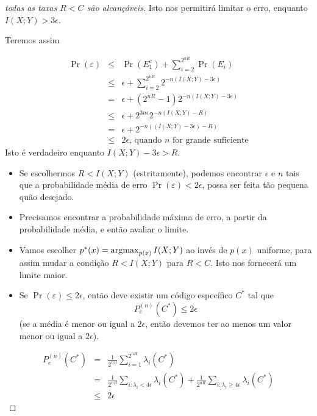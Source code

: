 \begin{frame}[allowframebreaks]
\begin{proof}[todas as taxas $R < C$ são alcançáveis]
  Isto nos permitirá limitar o erro, enquanto $I(X;Y) > 3\epsilon$.

  \proofbreak

  Teremos assim

  \vspace{-0.75cm}
  \begin{eqnarray}
  \Pr(\varepsilon) &\leq& \Pr(E_1^c) + \sum_{i=2}^{2^{nR}} \Pr(E_i) \nonumber \\
	&\leq& \epsilon + \sum_{i=2}^{2^{nR}} 2^{-n(I(X;Y)-3\epsilon)} \nonumber \\
	&=& \epsilon + (2^{nR} - 1) 2^{-n(I(X;Y)-3\epsilon)} \nonumber \\
	&\leq& \epsilon + 2^{3n\epsilon} 2^{-n(I(X;Y)-R)} \nonumber \\
	&=& \epsilon + 2^{-n((I(X;Y)-3\epsilon)-R)} \\
	&\leq& 2 \epsilon \text{, quando $n$ for grande suficiente}
  \end{eqnarray}
  \vspace{-0.3cm}
  Isto é verdadeiro enquanto $I(X;Y) -3\epsilon > R$.

  \proofbreak

  \begin{itemize}
  \item Se escolhermos $R < I(X;Y)$ (estritamente), podemos encontrar $\epsilon$ e $n$ tais que
	a probabilidade média de erro $\Pr(\varepsilon) < 2\epsilon$, possa ser feita tão pequena
	quão desejado.
  \item Precisamos encontrar a probabilidade máxima de erro, a partir da probabilidade média, e então avaliar o limite.
  \item Vamos escolher $p^\ast(x) = \operatorname*{\arg\!\max}_{p(x)} I(X;Y)$ ao invés de $p(x)$ uniforme, para assim mudar
	a condição $R < I(X;Y)$ para $R < C$. Isto nos fornecerá um limite maior.
  \end{itemize}
  \proofbreak
  \begin{itemize}
  \item Se $\Pr(\varepsilon) \leq 2 \epsilon$, então deve existir um código específico $C^\ast$ tal que
	\begin{equation}
	P_e^{(n)} (C^\ast) \leq 2 \epsilon
	\end{equation}
	(se a média é menor ou igual a $2\epsilon$, então devemos ter ao menos um valor menor ou igual a $2\epsilon$).
  \end{itemize}

  \proofbreak

  \begin{eqnarray}
  P_e^{(n)} (C^\ast) &=& \frac{1}{2^{nR}} \sum_{i=1}^{2^{nR}} \lambda_i (C^\ast) \nonumber \\
	&=& \frac{1}{2^{nR}} \sum_{i: \lambda_i < 4\epsilon} \lambda_i (C^\ast) + \frac{1}{2^{nR}} \sum_{i: \lambda_i \geq 4\epsilon} \lambda_i (C^\ast) \nonumber \\
	&\leq& 2 \epsilon
  \end{eqnarray}


\end{proof}
\end{frame}
